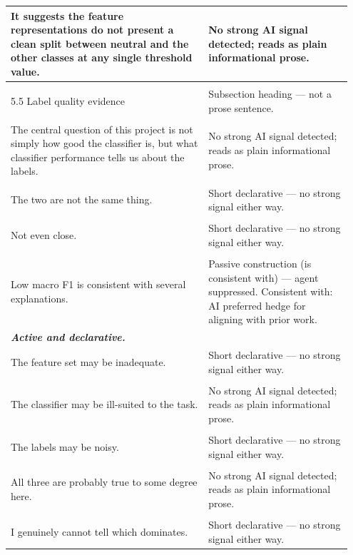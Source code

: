\documentclass[11pt]{article}
\begin{document}
\begin{longtable}{|p{0.55\linewidth}|p{0.40\linewidth}|}
\hline
It suggests the feature representations do not present a clean split between neutral and the other classes at any single threshold value. & No strong AI signal detected; reads as plain informational prose. \\[2pt]
\hline
\rule{0pt}{3.5cm} & \\
\hline
5.5 Label quality evidence & Subsection heading --- not a prose sentence. \\[2pt]
\hline
\rule{0pt}{3.5cm} & \\
\hline
The central question of this project is not simply how good the classifier is, but what classifier performance tells us about the labels. & No strong AI signal detected; reads as plain informational prose. \\[2pt]
\hline
\rule{0pt}{3.5cm} & \\
\hline
The two are not the same thing. & Short declarative --- no strong signal either way. \\[2pt]
\hline
\rule{0pt}{3.5cm} & \\
\hline
Not even close. & Short declarative --- no strong signal either way. \\[2pt]
\hline
\rule{0pt}{3.5cm} & \\
\hline
Low macro F1 is consistent with several explanations. & Passive construction (is consistent with) --- agent suppressed. Consistent with: AI preferred hedge for aligning with prior work. \\[2pt]
\hline
\textbf{\textit{Active and declarative.}}\vspace{2em} & \\
\hline
The feature set may be inadequate. & Short declarative --- no strong signal either way. \\[2pt]
\hline
\rule{0pt}{3.5cm} & \\
\hline
The classifier may be ill-suited to the task. & No strong AI signal detected; reads as plain informational prose. \\[2pt]
\hline
\rule{0pt}{3.5cm} & \\
\hline
The labels may be noisy. & Short declarative --- no strong signal either way. \\[2pt]
\hline
\rule{0pt}{3.5cm} & \\
\hline
All three are probably true to some degree here. & No strong AI signal detected; reads as plain informational prose. \\[2pt]
\hline
\rule{0pt}{3.5cm} & \\
\hline
I genuinely cannot tell which dominates. & Short declarative --- no strong signal either way. \\[2pt]

\end{longtable}
\end{document}
